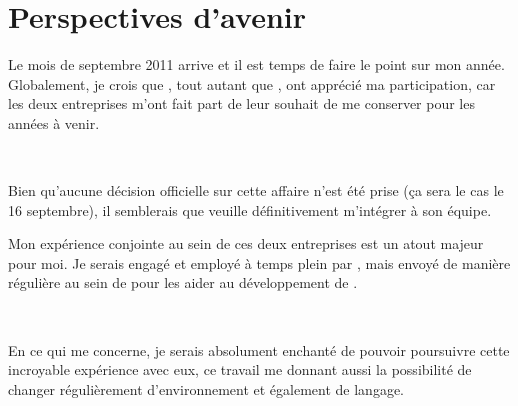 \chapter{Perspectives d'avenir}
Le mois de septembre 2011 arrive et il est temps de faire le point sur mon année. Globalement, je crois que \solulog{}, tout autant que \fidit{}, ont apprécié ma participation, car les deux entreprises m'ont fait part de leur souhait de me conserver pour les années à venir.

~

Bien qu'aucune décision officielle sur cette affaire n'est été prise (ça sera le cas le 16 septembre), il semblerais que \fidit{} veuille définitivement m'intégrer à son équipe.

Mon expérience conjointe au sein de ces deux entreprises est un atout majeur pour moi. Je serais engagé et employé à temps plein par \fidit, mais envoyé de manière régulière au sein de \solulog{} pour les aider au développement de \integrale.

~

En ce qui me concerne, je serais absolument enchanté de pouvoir poursuivre cette incroyable expérience avec eux, ce travail me donnant aussi la possibilité de changer régulièrement d'environnement et également de langage.

